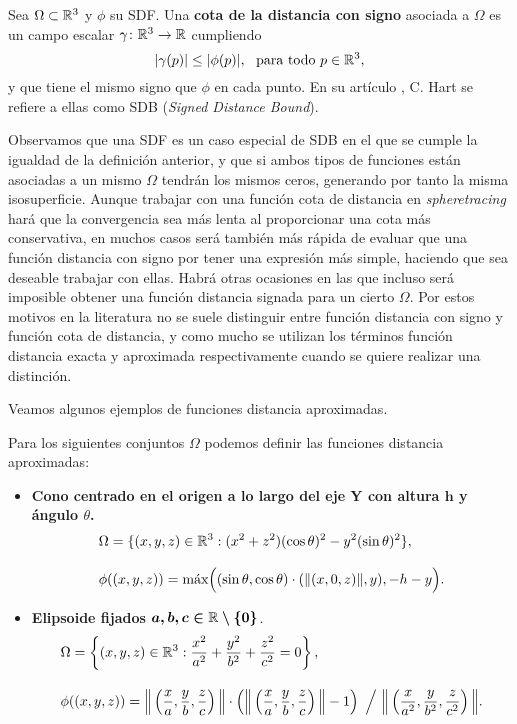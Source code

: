 \begin{definicion}
    Sea $\Omega\subset \R^3$ y $\phi$ su SDF. Una \textbf{cota de la distancia con signo} asociada a $\Omega$ es un campo escalar $\gamma\colon \R^3\to \R$ cumpliendo
    \begin{equation*}
        \vert \gamma(p)\vert \le \vert \phi(p)\vert,\ \text{ para todo } p\in\R^3,
    \end{equation*}
    y que tiene el mismo signo que $\phi$ en cada punto. En su artículo \cite{hart2}, C. Hart se refiere a ellas como SDB (\textit{Signed Distance Bound}).
\end{definicion}

Observamos que una SDF es un caso especial de SDB en el que se cumple la igualdad de la definición anterior, y que si ambos tipos de funciones están asociadas a un mismo $\Omega$ tendrán los mismos ceros, generando por tanto la misma isosuperficie. Aunque trabajar con una función cota de distancia en \textit{spheretracing} hará que la convergencia sea más lenta al proporcionar una cota más conservativa, en muchos casos será también más rápida de evaluar que una función distancia con signo por tener una expresión más simple, haciendo que sea deseable trabajar con ellas. Habrá otras ocasiones en las que incluso será imposible obtener una función distancia signada para un cierto $\Omega$. Por estos motivos en la literatura no se suele distinguir entre función distancia con signo y función cota de distancia, y como mucho se utilizan los términos función distancia exacta y aproximada respectivamente cuando se quiere realizar una distinción.\newline

Veamos algunos ejemplos de funciones distancia aproximadas.
\begin{ejemplo}\label{ej:sdf}
    Para los siguientes conjuntos $\Omega$ podemos definir las funciones distancia aproximadas:
    \begin{itemize}
        \item \textbf{Cono centrado en el origen a lo largo del eje Y con altura $\boldsymbol{h}$ y ángulo $\theta$.}
        \begin{align*}
            &\Omega=\{(x,y,z)\in \R^3 : (x^2+z^2)(\cos\theta)^2 - y^2(\sin\theta)^2\},\\[8pt]
            &\phi((x,y,z)) = \Max\Big((\sin\theta, \cos\theta)\cdot (\Vert (x,0,z)\Vert, y), -h-y\Big).
        \end{align*}
        \item \textbf{Elipsoide fijados $\boldsymbol{a,b,c\in \R\setminus \{0\}}$}.
        \begin{align*}
            &\Omega=\left\{(x,y,z)\in\R^3 : \frac{x^2}{a^2}+\frac{y^2}{b^2}+\frac{z^2}{c^2} = 0\right\},\\[10pt]
            &\phi((x,y,z)) = \Big\Vert \left( \frac{x}{a},\frac{y}{b},\frac{z}{c} \right) \Big\Vert \cdot \left(  \Big\Vert \left( \frac{x}{a},\frac{y}{b},\frac{z}{c} \right) \Big\Vert -1\right)\ \Big{/}\ \Big\Vert \left( \frac{x}{a^2},\frac{y}{b^2},\frac{z}{c^2} \right) \Big\Vert .
        \end{align*}
    \end{itemize}
\end{ejemplo}


